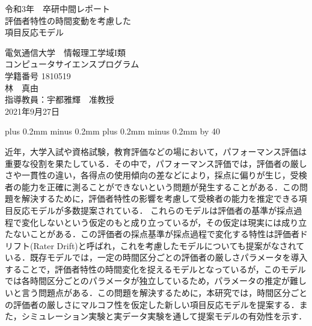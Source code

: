 \documentclass[a4paper,11pt,oneside,openany]{jsbook}
\def\kcharparline#1{%
   \ifx\xkanjiskip\undefined%
   \jintercharskip 0mm plus 0.2mm minus 0.2mm
   \else
   \xkanjiskip 0mm plus 0.2mm minus 0.2mm
   \fi
   \settowidth{\textwidth}{}%
   \multiply\textwidth by #1}
\begin{document}
\begin{titlepage}

\begin{center}
{\Large 令和3年　卒研中間レポート}\\ %
\vspace*{150truept}
{\huge 評価者特性の時間変動を考慮した\\項目反応モデル}\\ %
\vspace{120truept}

{\huge 電気通信大学　情報理工学域I類}\\ %
\vspace{10truept}
{\huge コンピュータサイエンスプログラム}\\ %
\vspace{10truept}
{\huge 学籍番号 1810519}\\ %
\vspace{50truept}
{\huge 林　真由}\\ %
\vspace{50truept}
{\huge 指導教員：宇都雅輝　准教授}\\
\vspace{50truept}
{\huge 2021年9月27日}\\ %
\end{center}
\end{titlepage}
\kcharparline{40} %

\frontmatter
近年，大学入試や資格試験，教育評価などの場において，パフォーマンス評価は重要な役割を果たしている．その中で，パフォーマンス評価では，評価者の厳しさや一貫性の違い，各得点の使用傾向の差などにより，採点に偏りが生じ，受検者の能力を正確に測ることができないという問題が発生することがある．この問題を解決するために，評価者特性の影響を考慮して受検者の能力を推定できる項目反応モデルが多数提案されている．
これらのモデルは評価者の基準が採点過程で変化しないという仮定のもと成り立っているが，その仮定は現実には成り立たないことがある．この評価者の採点基準が採点過程で変化する特性は評価者ドリフト(Rater Drift)と呼ばれ，これを考慮したモデルについても提案がなされている．既存モデルでは，一定の時間区分ごとの評価者の厳しさパラメータを導入することで，評価者特性の時間変化を捉えるモデルとなっているが，このモデルでは各時間区分ごとのパラメータが独立しているため，パラメータの推定が難しいと言う問題点がある．この問題を解決するために，本研究では，時間区分ごとの評価者の厳しさにマルコフ性を仮定した新しい項目反応モデルを提案する．また，シミュレーション実験と実データ実験を通して提案モデルの有効性を示す．
\tableofcontents
%
%
\mainmatter
\end{document}
